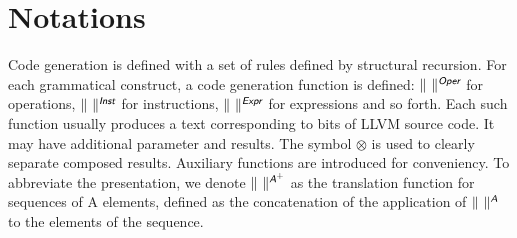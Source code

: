 \documentclass{article}
\newcommand{\trad}[2]{\ensuremath{\lVert \textsf{#1} \rVert^{\textit{#2}}}}
\newcommand{\B}[1]{\textsf{#1}}
\newcommand{\ListOf}[1]{$\mbox{#1}^+$}
\newcommand{\sep}[0]{\otimes}
\begin{document}
\section{Notations}
\label{sec:notation}

Code generation is defined with a set of rules defined by
structural recursion. For each grammatical construct, a code generation function
is defined: $\trad{~}{\B{Oper}}$ for operations, $\trad{~}{\B{Inst}}$ for
instructions, $\trad{~}{\B{Expr}}$ for expressions and so forth. Each such
function usually produces a text corresponding to bits of LLVM source code. It
may have additional parameter and results. The symbol $\sep$ is used to clearly
separate composed results. Auxiliary functions are introduced for
conveniency. To abbreviate the presentation, we denote
$\trad{~}{\ListOf{\B{A}}}$ as the translation function for sequences of \B{A}
elements, defined as the concatenation of the application of $\trad{~}{\B{A}}$
to the elements of the sequence.
\end{document}
